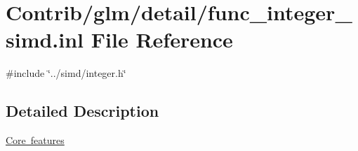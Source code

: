 \hypertarget{func__integer__simd_8inl}{}\section{Contrib/glm/detail/func\+\_\+integer\+\_\+simd.inl File Reference}
\label{func__integer__simd_8inl}
{\ttfamily \#include \char`\"{}../simd/integer.\+h\char`\"{}}\newline


\subsection{Detailed Description}
\mbox{\hyperlink{group__core}{Core features}} 
